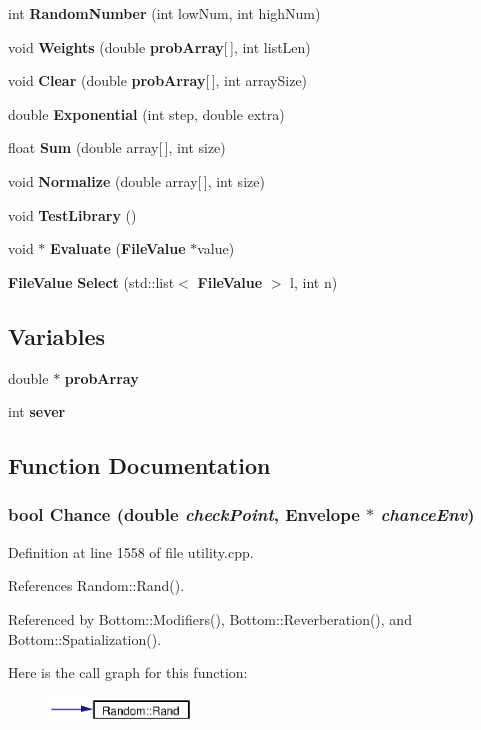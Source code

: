 \begin{CompactItemize}
\item 
int {\bf Random\-Number} (int low\-Num, int high\-Num)
\item 
void {\bf Weights} (double {\bf prob\-Array}[$\,$], int list\-Len)
\item 
void {\bf Clear} (double {\bf prob\-Array}[$\,$], int array\-Size)
\item 
double {\bf Exponential} (int step, double extra)
\item 
float {\bf Sum} (double array[$\,$], int size)
\item 
void {\bf Normalize} (double array[$\,$], int size)
\item 
void {\bf Test\-Library} ()
\item 
void $\ast$ {\bf Evaluate} ({\bf File\-Value} $\ast$value)
\item 
{\bf File\-Value} {\bf Select} (std::list$<$ {\bf File\-Value} $>$ l, int n)
\end{CompactItemize}
\subsection*{Variables}
\begin{CompactItemize}
\item 
double $\ast$ {\bf prob\-Array}
\item 
int {\bf sever}
\end{CompactItemize}


\subsection{Function Documentation}
\subsubsection{\setlength{\rightskip}{0pt plus 5cm}bool Chance (double {\em check\-Point}, Envelope $\ast$ {\em chance\-Env})}\label{utility_8h_a37}




Definition at line 1558 of file utility.cpp.

References Random::Rand().

Referenced by Bottom::Modifiers(), Bottom::Reverberation(), and Bottom::Spatialization().

Here is the call graph for this function:\begin{figure}[H]
\begin{center}
\leavevmode
\includegraphics[width=109pt]{utility_8h_a37_cgraph}
\end{center}
\end{figure}
